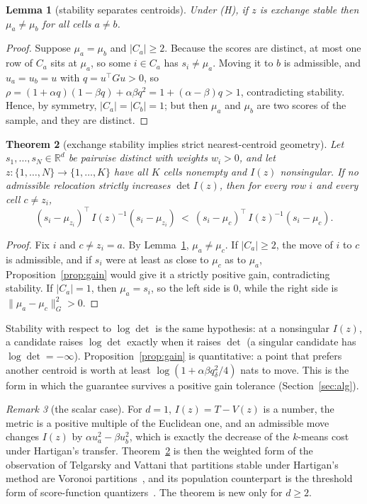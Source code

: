 \documentclass[11pt]{amsart}
\newtheorem{theorem}{Theorem}[section]
\newtheorem{lemma}[theorem]{Lemma}
\theoremstyle{definition}
\theoremstyle{remark}
\newtheorem{remark}[theorem]{Remark}
\newcommand{\R}{\mathbb{R}}
\newcommand{\T}{^{\top}}
\newcommand{\Ib}{I(z)}
\begin{document}
\begin{lemma}[stability separates centroids]\label{lem:distinct}
Under (H), if $z$ is exchange stable then $\mu_a\ne\mu_b$ for all cells $a\ne b$.
\end{lemma}

\begin{proof}
Suppose $\mu_a=\mu_b$ and $|C_a|\ge2$. Because the scores are distinct, at most one row of $C_a$
sits at $\mu_a$, so some $i\in C_a$ has $s_i\ne\mu_a$. Moving it to $b$ is admissible, and
$u_a=u_b=u$ with $q=u\T Gu>0$, so $\rho=(1+\alpha q)(1-\beta q)+\alpha\beta q^2=1+(\alpha-\beta)q>1$,
contradicting stability. Hence, by symmetry, $|C_a|=|C_b|=1$; but then $\mu_a$ and $\mu_b$ are two scores of
the sample, and they are distinct.
\end{proof}

\begin{theorem}[exchange stability implies strict nearest-centroid geometry]\label{thm:main}
Let $s_1,\dots,s_N\in\R^d$ be pairwise distinct with weights $w_i>0$, and let
$z:\{1,\dots,N\}\to\{1,\dots,K\}$ have all $K$ cells nonempty and $\Ib$ nonsingular. If no
admissible relocation strictly increases $\det\Ib$, then for every row $i$ and every cell
$c\ne z_i$,
\[
(s_i-\mu_{z_i})\T\,\Ib^{-1}(s_i-\mu_{z_i})\ <\ (s_i-\mu_c)\T\,\Ib^{-1}(s_i-\mu_c).
\]
\end{theorem}

\begin{proof}
Fix $i$ and $c\ne z_i=a$. By Lemma~\ref{lem:distinct}, $\mu_a\ne\mu_c$. If $|C_a|\ge2$, the move
of $i$ to $c$ is admissible, and if $s_i$ were at least as close to $\mu_c$ as to $\mu_a$,
Proposition~\ref{prop:gain} would give it a strictly positive gain, contradicting stability. If
$|C_a|=1$, then $\mu_a=s_i$, so the left side is $0$, while the right side is
$\|\mu_a-\mu_c\|_G^2>0$.
\end{proof}

Stability with respect to $\log\det$ is the same hypothesis: at a nonsingular $\Ib$, a candidate
raises $\log\det$ exactly when it raises $\det$ (a singular candidate has $\log\det=-\infty$).
Proposition~\ref{prop:gain} is quantitative: a point that prefers another centroid is worth at
least $\log(1+\alpha\beta q_\delta^2/4)$ nats to move. This is the form in which the guarantee
survives a positive gain tolerance (Section~\ref{sec:alg}).

\begin{remark}[the scalar case]
For $d=1$, $\Ib=T-V(z)$ is a number, the metric is a positive multiple of the Euclidean one, and
an admissible move changes $\Ib$ by $\alpha u_a^2-\beta u_b^2$, which is exactly the decrease of
the $k$-means cost under Hartigan's transfer. Theorem~\ref{thm:main} is then the weighted form of
the observation of Telgarsky and Vattani that partitions stable under Hartigan's method are
Voronoi partitions~\cite{telgarsky2010},
and its population counterpart is the threshold form of score-function
quantizers~\cite{venkitasubramaniam2006}. The theorem is new only for $d\ge2$.
\end{remark}
\end{document}
